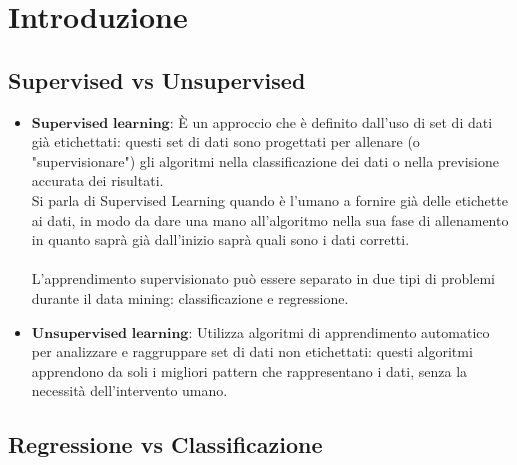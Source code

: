 \chapter{Introduzione}

	\section{Supervised vs Unsupervised}
		
		\begin{itemize}
			\item $\textbf{Supervised learning}$: È un approccio che è definito dall'uso di set di dati già etichettati: questi set di dati sono progettati per allenare (o "supervisionare") gli algoritmi nella classificazione dei dati o nella previsione accurata dei risultati.
				\\[1\baselineskip]
				Si parla di Supervised Learning quando è l'umano a fornire già delle etichette ai dati, in modo da dare una mano all'algoritmo nella sua fase di allenamento in quanto saprà già dall'inizio saprà quali sono i dati corretti.\\
				\\[1\baselineskip]
				L'apprendimento supervisionato può essere separato in due tipi di problemi durante il data mining: classificazione e regressione.
				\\[2\baselineskip]

			\item $\textbf{Unsupervised learning}$: Utilizza algoritmi di apprendimento automatico per analizzare e raggruppare set di dati non etichettati: questi algoritmi apprendono da soli i migliori pattern che rappresentano i dati, senza la necessità dell'intervento umano.
		\end{itemize}

	\clearpage

	\section{Regressione vs Classificazione}
		
